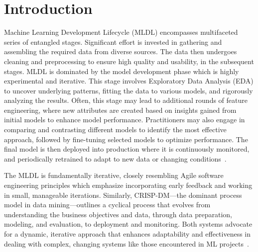 \section{Introduction}

Machine Learning Development Lifecycle (MLDL) encompasses multifaceted series of entangled stages. Significant effort is invested in gathering and assembling the required data from diverse sources. The data then undergoes cleaning and preprocessing to ensure high quality and usability, in the subsequent stages. MLDL is dominated by the model development phase which is highly experimental and iterative. This stage involves Exploratory Data Analysis (EDA) to uncover underlying patterns, fitting the data to various models, and rigorously analyzing the results. Often, this stage may lead to additional rounds of feature engineering, where new attributes are created based on insights gained from initial models to enhance model performance. Practitioners may also engage in comparing and contrasting different models to identify the most effective approach, followed by fine-tuning selected models to optimize performance. The final model is then deployed into production where it is continuously monitored, and periodically retrained to adapt to new data or changing conditions~\cite{haakman2021ai,amershi2019software,sculley2015hidden}.


The MLDL is fundamentally iterative, closely resembling Agile software engineering principles which emphasize incorporating early feedback and working in small, manageable iterations. Similarly, CRISP-DM---the dominant process model in data mining---outlines a cyclical process that evolves from understanding the business objectives and data, through data preparation, modeling, and evaluation, to deployment and monitoring. Both systems advocate for a dynamic, iterative approach that enhances adaptability and effectiveness in dealing with complex, changing systems like those encountered in ML projects~\cite{betz2018managing,martinez-plumed2021crisp-dm}.


